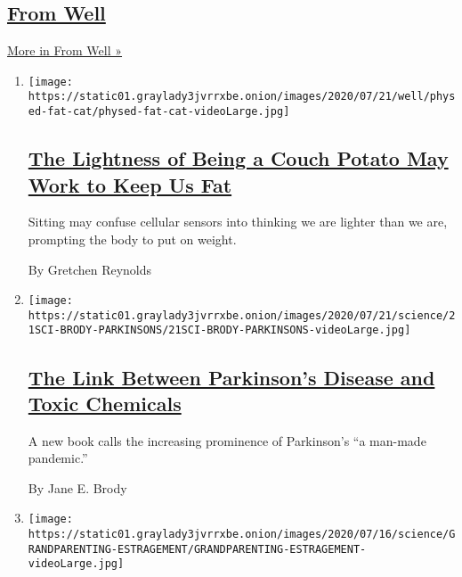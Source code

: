\hypertarget{from-well}{%
\subsection{\texorpdfstring{\href{/section/well}{From
Well}}{From Well}}\label{from-well}}

\href{/section/well}{More in From Well »}

\begin{enumerate}
\def\labelenumi{\arabic{enumi}.}
\item
  \texttt{[image: https://static01.graylady3jvrrxbe.onion/images/2020/07/21/well/physed-fat-cat/physed-fat-cat-videoLarge.jpg]}

  \hypertarget{the-lightness-of-being-a-couch-potato-may-work-to-keep-us-fat}{%
  \subsection{\texorpdfstring{\href{/2020/07/22/well/move/the-lightness-of-being-a-couch-potato-may-work-to-keep-us-fat.html}{The
  Lightness of Being a Couch Potato May Work to Keep Us
  Fat}}{The Lightness of Being a Couch Potato May Work to Keep Us Fat}}\label{the-lightness-of-being-a-couch-potato-may-work-to-keep-us-fat}}

  Sitting may confuse cellular sensors into thinking we are lighter than
  we are, prompting the body to put on weight.

  By Gretchen Reynolds
\item
  \texttt{[image: https://static01.graylady3jvrrxbe.onion/images/2020/07/21/science/21SCI-BRODY-PARKINSONS/21SCI-BRODY-PARKINSONS-videoLarge.jpg]}

  \hypertarget{the-link-between-parkinsons-disease-and-toxic-chemicals}{%
  \subsection{\texorpdfstring{\href{/2020/07/20/well/live/parkinsons-disease-toxic-chemicals.html}{The
  Link Between Parkinson's Disease and Toxic
  Chemicals}}{The Link Between Parkinson's Disease and Toxic Chemicals}}\label{the-link-between-parkinsons-disease-and-toxic-chemicals}}

  A new book calls the increasing prominence of Parkinson's ``a man-made
  pandemic.''

  By Jane E. Brody
\item
  \texttt{[image: https://static01.graylady3jvrrxbe.onion/images/2020/07/16/science/GRANDPARENTING-ESTRAGEMENT/GRANDPARENTING-ESTRAGEMENT-videoLarge.jpg]}


\end{enumerate}
